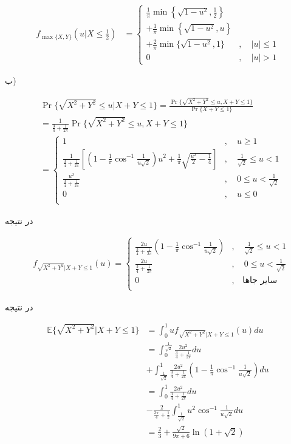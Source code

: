 \documentclass[10pt,letterpaper]{report}
\newcommand{\eqn}[1]{
\[\begin{split}
#1
\end{split}\]
}
\begin{document}
\eqn{
f_{\max\{X,Y\}}(u|X\le \frac{1}{2})
&=
\begin{cases}
\frac{1}{\pi}\min\left\{\sqrt{1-u^2},\frac{1}{2}\right\}\\+
\frac{1}{\pi}\min\left\{\sqrt{1-u^2},u\right\}\\+
\frac{2}{\pi}\min\{\sqrt{1-u^2},1\}&,\quad |u|\le 1\\
0&,\quad |u|>1
\end{cases}
}

ب)

\eqn{
&\Pr\{\sqrt{X^2+Y^2}\le u|X+Y\le 1\}=
\frac{\Pr\{\sqrt{X^2+Y^2}\le u,X+Y\le 1\}}{\Pr\{X+Y\le 1\}}
\\&=
\frac{1}{\frac{3}{4}+\frac{1}{2\pi}}
\Pr\{\sqrt{X^2+Y^2}\le u,X+Y\le 1\}
\\&=
\begin{cases}
1&,\quad u\ge 1\\
\frac{1}{\frac{3}{4}+\frac{1}{2\pi}}
\left[(1-\frac{1}{\pi}\cos^{-1}\frac{1}{u\sqrt 2})u^2+\frac{1}{\pi}\sqrt{\frac{u^2}{2}-\frac{1}{4}}\right]&,\quad \frac{1}{\sqrt 2}\le u< 1\\
\frac{u^2}{\frac{3}{4}+\frac{1}{2\pi}}&,\quad 0\le u< \frac{1}{\sqrt 2}\\
0&,\quad u\le 0\\
\end{cases}
}
در نتیجه
\eqn{
&f_{\sqrt{X^2+Y^2}|X+Y\le 1}(u)=
\begin{cases}
\frac{2u}{\frac{3}{4}+\frac{1}{2\pi}}
(1-\frac{1}{\pi}\cos^{-1}\frac{1}{u\sqrt 2})&,\quad \frac{1}{\sqrt 2}\le u< 1\\
\frac{2u}{\frac{3}{4}+\frac{1}{2\pi}}&,\quad 0\le u< \frac{1}{\sqrt 2}\\
0&,\quad \text{سایر جاها}\\
\end{cases}
}
در نتیجه
\eqn{
\mathbb{E}\{\sqrt{X^2+Y^2}|X+Y\le 1\}
&=\int_0^1 uf_{\sqrt{X^2+Y^2}|X+Y\le 1}(u)du
\\&=
\int_0^{\frac{1}{\sqrt2}} \frac{2u^2}{\frac{3}{4}+\frac{1}{2\pi}}du
\\&+
\int_{\frac{1}{\sqrt2}}^1 \frac{2u^2}{\frac{3}{4}+\frac{1}{2\pi}}
(1-\frac{1}{\pi}\cos^{-1}\frac{1}{u\sqrt 2})du
\\&=
\int_0^1 \frac{2u^2}{\frac{3}{4}+\frac{1}{2\pi}}du
\\&-
\frac{2}{\frac{3\pi}{4}+\frac{1}{2}}\int_{\frac{1}{\sqrt2}}^1 u^2\cos^{-1}\frac{1}{u\sqrt 2}du
\\&=
\frac{2}{3}+\frac{\sqrt2}{9\pi+6}\ln(1+\sqrt 2)
}
%
%
%
\end{document}
